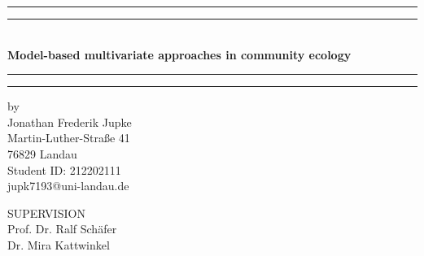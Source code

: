 \documentclass[a4paper,12pt]{article}
\begin{document}
		
		
		\begin{titlepage}
			
			\begin{center}
				
				\vspace*{3cm}
							
				
				\begingroup
					\rule{\textwidth}{1.6pt}\vspace*{-\baselineskip}\vspace*{2pt} 							
					\rule{\textwidth}{0.4pt} 	
					\vspace{.1em} \\	
					\textbf{\LARGE Model-based multivariate approaches in community ecology}\\	
					\vspace{0.25\baselineskip} 
					\rule{\textwidth}{0.4pt}\vspace*{-\baselineskip}\vspace{3.2pt} 
					\rule{\textwidth}{1.6pt} 
				\endgroup
				
				
				\vspace{2.5em}
				
				\begingroup
					by\\
					\Large
					 Jonathan Frederik Jupke \\[.5em]
					\normalsize
					Martin-Luther-Stra{\ss}e 41\\
					76829 Landau \\
					 Student ID: 212202111 \\
					jupk7193@uni-landau.de \\
				\endgroup
				
				
				\vspace{2.5em}
				
				\begingroup
					SUPERVISION\\
					\Large
					 Prof. Dr. Ralf Sch{\"a}fer\\
					 Dr. Mira Kattwinkel\\
				\endgroup
				

\end{center}
\end{titlepage}
\end{document}
